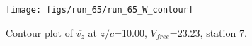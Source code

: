 \begin{figure}[H]
\centering
\texttt{[image: figs/run\_65/run\_65\_W\_contour]}
\caption{Contour plot of $\overline{v_{z}}$ at $z/c$=10.00, $V_{free}$=23.23, station 7.}
\label{fig:run_65_W_contour}
\end{figure}


